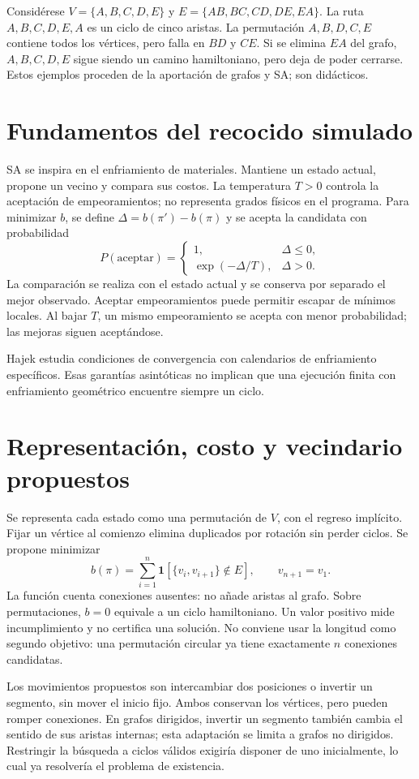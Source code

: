 Considérese $V=\{A,B,C,D,E\}$ y $E=\{AB,BC,CD,DE,EA\}$. La ruta $A,B,C,D,E,A$ es un ciclo de cinco aristas. La permutación $A,B,D,C,E$ contiene todos los vértices, pero falla en $BD$ y $CE$. Si se elimina $EA$ del grafo, $A,B,C,D,E$ sigue siendo un camino hamiltoniano, pero deja de poder cerrarse. Estos ejemplos proceden de la aportación de grafos y SA; son didácticos.

\section{Fundamentos del recocido simulado}
SA se inspira en el enfriamiento de materiales. Mantiene un estado actual, propone un vecino y compara sus costos. La temperatura $T>0$ controla la aceptación de empeoramientos; no representa grados físicos en el programa. Para minimizar $b$, se define $\Delta=b(\pi')-b(\pi)$ y se acepta la candidata con probabilidad
\[
P(\text{aceptar})=\begin{cases}1,&\Delta\leq0,\\ \exp(-\Delta/T),&\Delta>0.\end{cases}
\]
La comparación se realiza con el estado actual y se conserva por separado el mejor observado. Aceptar empeoramientos puede permitir escapar de mínimos locales. Al bajar $T$, un mismo empeoramiento se acepta con menor probabilidad; las mejoras siguen aceptándose.\cite{sa4,sa8}

Hajek estudia condiciones de convergencia con calendarios de enfriamiento específicos. Esas garantías asintóticas no implican que una ejecución finita con enfriamiento geométrico encuentre siempre un ciclo.\cite{sa5}

\section{Representación, costo y vecindario propuestos}
Se representa cada estado como una permutación de $V$, con el regreso implícito. Fijar un vértice al comienzo elimina duplicados por rotación sin perder ciclos. Se propone minimizar
\[
b(\pi)=\sum_{i=1}^{n}\mathbf{1}[\{v_i,v_{i+1}\}\notin E],\qquad v_{n+1}=v_1.
\]
La función cuenta conexiones ausentes: no añade aristas al grafo. Sobre permutaciones, $b=0$ equivale a un ciclo hamiltoniano. Un valor positivo mide incumplimiento y no certifica una solución. No conviene usar la longitud como segundo objetivo: una permutación circular ya tiene exactamente $n$ conexiones candidatas.

Los movimientos propuestos son intercambiar dos posiciones o invertir un segmento, sin mover el inicio fijo. Ambos conservan los vértices, pero pueden romper conexiones. En grafos dirigidos, invertir un segmento también cambia el sentido de sus aristas internas; esta adaptación se limita a grafos no dirigidos. Restringir la búsqueda a ciclos válidos exigiría disponer de uno inicialmente, lo cual ya resolvería el problema de existencia.

